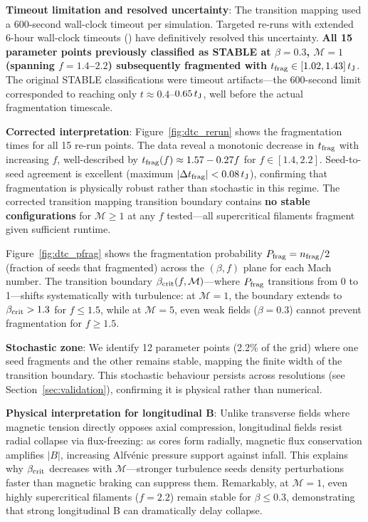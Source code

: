 \documentclass[twoside,twocolumn]{mnras}
\begin{document}
\textbf{Timeout limitation and resolved uncertainty}: The transition mapping used a 600-second wall-clock timeout per simulation. Targeted re-runs with extended 6-hour wall-clock timeouts () have definitively resolved this uncertainty. \textbf{All 15 parameter points previously classified as STABLE at $\beta = 0.3$, $\mathcal{M} = 1$ (spanning $f = 1.4$--$2.2$) subsequently fragmented with $t_{\rm frag} \in [1.02, 1.43]\,t_{\rm J}$}. The original STABLE classifications were timeout artifacts—the 600-second limit corresponded to reaching only $t \approx 0.4$--$0.65\,t_{\rm J}$, well before the actual fragmentation timescale.

\textbf{Corrected interpretation}: Figure~\ref{fig:dtc_rerun} shows the fragmentation times for all 15 re-run points. The data reveal a monotonic decrease in $t_{\rm frag}$ with increasing $f$, well-described by $t_{\rm frag}(f) \approx 1.57 - 0.27f$ for $f \in [1.4, 2.2]$. Seed-to-seed agreement is excellent (maximum $|\Delta t_{\rm frag}| < 0.08\,t_{\rm J}$), confirming that fragmentation is physically robust rather than stochastic in this regime. The corrected transition mapping transition boundary contains \textbf{no stable configurations} for $\mathcal{M} \geq 1$ at any $f$ tested—all supercritical filaments fragment given sufficient runtime.

Figure~\ref{fig:dtc_pfrag} shows the fragmentation probability $P_{\rm frag} = n_{\rm frag}/2$ (fraction of seeds that fragmented) across the $(\beta, f)$ plane for each Mach number. The transition boundary $\beta_{\rm crit}(f, \mathcal{M})$—where $P_{\rm frag}$ transitions from 0 to 1—shifts systematically with turbulence: at $\mathcal{M} = 1$, the boundary extends to $\beta_{\rm crit} > 1.3$ for $f \leq 1.5$, while at $\mathcal{M} = 5$, even weak fields ($\beta = 0.3$) cannot prevent fragmentation for $f \geq 1.5$.

\textbf{Stochastic zone}: We identify 12 parameter points (2.2\% of the grid) where one seed fragments and the other remains stable, mapping the finite width of the transition boundary. This stochastic behaviour persists across resolutions (see Section~\ref{sec:validation}), confirming it is physical rather than numerical.

\textbf{Physical interpretation for longitudinal B}: Unlike transverse fields where magnetic tension directly opposes axial compression, longitudinal fields resist radial collapse via flux-freezing: as cores form radially, magnetic flux conservation amplifies $|B|$, increasing Alfv\'enic pressure support against infall. This explains why $\beta_{\rm crit}$ decreases with $\mathcal{M}$—stronger turbulence seeds density perturbations faster than magnetic braking can suppress them. Remarkably, at $\mathcal{M} = 1$, even highly supercritical filaments ($f = 2.2$) remain stable for $\beta \leq 0.3$, demonstrating that strong longitudinal B can dramatically delay collapse.
\end{document}
